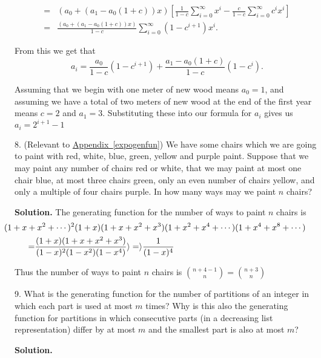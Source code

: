 \documentclass[10pt,]{book}
\theoremstyle{plain}
\theoremstyle{definition}
\theoremstyle{definition}
\numberwithin{equation}{chapter}
\newcommand{\amp}{&}
\begin{document}
\begin{exerciselist}
\begin{align*}
=\amp  (a_0+(a_1-a_0(1+c))x)\left[\frac{1}{1-c}\sum_{i=0}^\infty x^i-\frac{c}{1-c}\sum_{i=0}^\infty c^ix^i\right]\\
=\amp  \frac{(a_0+(a_1-a_0(1+c))x)}{1-c}\sum_{i=0}^\infty
(1-c^{i+1})x^i.
\end{align*}
%
\par
From this we get that%
\begin{equation*}
a_i=\frac{a_0}{1-c}(1-c^{i+1}) +\frac{a_1-a_0(1+c)}{1-c}(1-c^i).
\end{equation*}
%
\par
Assuming that we begin with one meter of new wood means \(a_0=1\), and assuming we have a total of two meters of new wood at the end of the first year means \(c=2\) and \(a_1=3\). Substituting these into our formula for \(a_i\) gives us \(a_i=2^{i+1}-1\)%
\item[8.]\hypertarget{exercise-44}{}(Relevant to \hyperref[expogenfun]{Appendix~\ref{expogenfun}}) We have some chairs which we are going to paint with red, white, blue, green, yellow and purple paint. Suppose that we may paint any number of chairs red or white, that we may paint at most one chair blue, at most three chairs green, only an even number of chairs yellow, and only a multiple of four chairs purple. In how many ways may we paint \(n\) chairs?%
\par\smallskip
\par\smallskip
\noindent\textbf{Solution.}\hypertarget{solution-365}{}\quad
The generating function for the number of ways to paint \(n\) chairs is%
\begin{align*}
\amp \hspace{-.5in}(1+x+x^2+\cdots)^2(1+x)(1+x+x^2+x^3)(1+x^2+x^4+\cdots)
(1+x^4+x^8+\cdots)\\
=\amp
\frac{(1+x)(1+x+x^2+x^3)}{(1-x)^2(1-x^2)(1-x^4)}\rangle =\rangle  \frac{1}{(1-x)^4}
\end{align*}
%
\par
Thus the number of ways to paint \(n\) chairs is \(\binom{n+4-1}{n}=\binom{n+3}{n}\)%
\item[9.]\hypertarget{exercise-45}{}What is the generating function for the number of partitions of an integer in which each part is used at most \(m\) times? Why is this also the generating function for partitions in which consecutive parts (in a decreasing list representation) differ by at most \(m\) and the smallest part is also at most \(m\)?%
\par\smallskip
\par\smallskip
\noindent\textbf{Solution.}\hypertarget{solution-366}{}\quad

\end{exerciselist}
\end{document}
